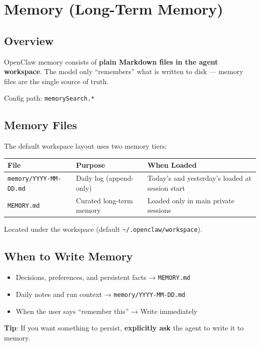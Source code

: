 \chapter{Memory (Long-Term Memory)}

\section{Overview}

OpenClaw memory consists of \textbf{plain Markdown files in the agent workspace}. The model only ``remembers'' what is written to disk --- memory files are the single source of truth.

Config path: \texttt{memorySearch.*}

\section{Memory Files}

The default workspace layout uses two memory tiers:

\begin{center}
\begin{tabular}{lll}
\toprule
\textbf{File} & \textbf{Purpose} & \textbf{When Loaded} \\
\midrule
\texttt{memory/YYYY-MM-DD.md} & Daily log (append-only) & Today's and yesterday's loaded at session start \\
\texttt{MEMORY.md} & Curated long-term memory & Loaded only in main private sessions \\
\bottomrule
\end{tabular}
\end{center}

Located under the workspace (default \texttt{\textasciitilde{}/.openclaw/workspace}).

\section{When to Write Memory}

\begin{itemize}
  \item Decisions, preferences, and persistent facts → \texttt{MEMORY.md}
  \item Daily notes and run context → \texttt{memory/YYYY-MM-DD.md}
  \item When the user says ``remember this'' → Write immediately
\end{itemize}

\textbf{Tip}: If you want something to persist, \textbf{explicitly ask} the agent to write it to memory.

